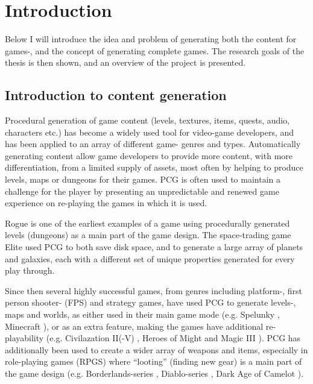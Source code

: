 \documentclass[a4paper,titlepage,final]{report}
\begin{document}
\tableofcontents
\newpage


\chapter{Introduction}
Below I will introduce the idea and problem of generating both the content for games-, and the concept of generating complete games.
The research goals of the thesis is then shown, and an overview of the project is presented.

\section{Introduction to content generation}
\label{sec_introtocontentgen}

Procedural generation of game content (levels, textures, items, quests, audio, characters etc.) has become a widely used tool for video-game developers, and has been applied to an array of different game- genres and types.
Automatically generating content allow game developers to provide more content, with more differentiation, from a limited supply of assets, most often by helping to produce levels, maps or dungeons for their games. 
PCG is often used to maintain a challenge for the player by presenting an unpredictable and renewed game experience on re-playing the games in which it is used.

Rogue \citep{game:rogue} is one of the earliest examples of a game using procedurally generated levels (dungeons) as a main part of the game design.
The space-trading game Elite \citep{game:elite} used PCG to both save disk space, and to generate a large array of planets and galaxies, each with a different set of unique properties generated for every play through. 

Since then several highly successful games, from genres including platform-, first person shooter- (FPS) and strategy games, have used PCG to generate levels-, maps and worlds, as either used in their main game mode (e.g. Spelunky \citep{game:spelunky}, Minecraft \citep{game:minecraft}), or as an extra feature, making the games have additional re-playability (e.g. Civilazation II(-V) \citep{game:civilizationii}, Heroes of Might and Magic III \citep{game:homm3}).
PCG has additionally been used to create a wider array of weapons and items, especially in role-playing games (RPGS) where ``looting'' (finding new gear) is a main part of the game design (e.g. Borderlands-series \citep{game:borderlandsseries}, Diablo-series \citep{game:diabloseries}, Dark Age of Camelot \citep{game:darkage}).
\end{document}
